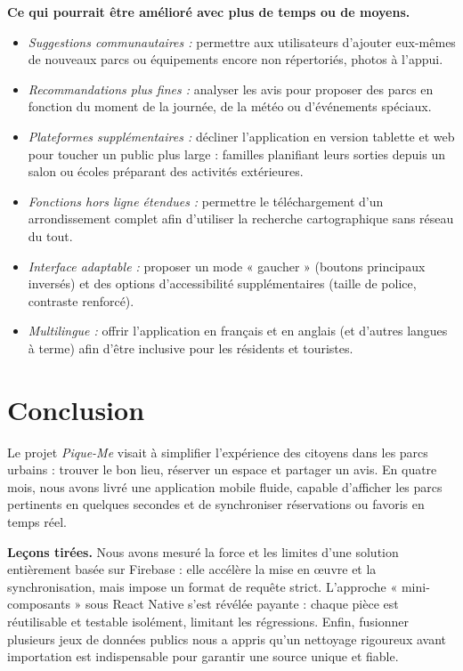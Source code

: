 \documentclass[12pt,a4paper]{article}
\begin{document}
\medskip\noindent
\textbf{Ce qui pourrait être amélioré avec plus de temps ou de moyens.}
\begin{itemize}
  \item \emph{Suggestions communautaires :} permettre aux utilisateurs
        d'ajouter eux-mêmes de nouveaux parcs ou équipements encore non
        répertoriés, photos à l'appui.
  \item \emph{Recommandations plus fines :} analyser les avis pour
        proposer des parcs en fonction du moment de la journée, de la
        météo ou d'événements spéciaux.
  \item \emph{Plateformes supplémentaires :} décliner l'application en
        version tablette et web pour toucher un public plus large :
        familles planifiant leurs sorties depuis un salon ou écoles
        préparant des activités extérieures.
  \item \emph{Fonctions hors ligne étendues :} permettre le
        téléchargement d'un arrondissement complet afin d'utiliser la
        recherche cartographique sans réseau du tout.
  \item \emph{Interface adaptable :} proposer un mode « gaucher »
        (boutons principaux inversés) et des options d'accessibilité
        supplémentaires (taille de police, contraste renforcé).
  \item \emph{Multilingue :} offrir l'application en français et en
        anglais (et d'autres langues à terme) afin d'être inclusive
        pour les résidents et touristes.
\end{itemize}


\medskip\noindent

\clearpage
\section{Conclusion}

Le projet \textit{Pique-Me} visait à simplifier l'expérience des citoyens dans les parcs urbains : trouver le bon lieu, réserver un espace et partager un avis. En quatre mois, nous avons livré une application mobile fluide, capable d'afficher les parcs pertinents en quelques secondes et de synchroniser réservations ou favoris en temps réel. 

\medskip\noindent
\textbf{Leçons tirées.}  
Nous avons mesuré la force et les limites d'une solution entièrement basée sur Firebase : elle accélère la mise en œuvre et la synchronisation, mais impose un format de requête strict. L'approche « mini-composants » sous React Native s'est révélée payante : chaque pièce est réutilisable et testable isolément, limitant les régressions. Enfin, fusionner plusieurs jeux de données publics nous a appris qu'un nettoyage rigoureux avant importation est indispensable pour garantir une source unique et fiable.
\end{document}
